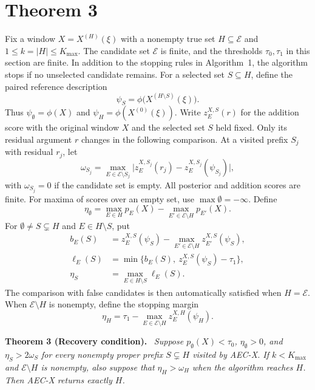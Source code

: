 \documentclass[10pt]{article}
\newcommand{\aecx}{\textup{\textsc{AEC-X}}\xspace}
\newcommand{\E}{\mathcal{E}}
\newenvironment{result}[1]{\par\medskip\noindent\textbf{#1.}\ \itshape\ignorespaces}{\par\medskip}
\theoremstyle{plain}
\theoremstyle{remark}
\begin{document}
\section{Theorem 3}
\label{sec:s-recovery}

Fix a window $X=X^{(H)}(\xi)$ with a nonempty true set $H\subseteq\E$ and $1\le k=|H|\le K_{\max}$. The candidate set $\E$ is finite, and the thresholds $\tau_0,\tau_1$ in this section are finite. In addition to the stopping rules in Algorithm~1, the algorithm stops if no unselected candidate remains. For a selected set $S\subseteq H$, define the paired reference description
\[
 \psi_S=\phi\bigl(X^{(H\setminus S)}(\xi)\bigr).
\]
Thus $\psi_\emptyset=\phi(X)$ and $\psi_H=\phi(X^{(0)}(\xi))$. Write $z_E^{X,S}(r)$ for the addition score with the original window $X$ and the selected set $S$ held fixed. Only its residual argument $r$ changes in the following comparison. At a visited prefix $S_j$ with residual $r_j$, let
\[
 \omega_{S_j}
 =\max_{E\in\E\setminus S_j}
  \bigl|z_E^{X,S_j}(r_j)-z_E^{X,S_j}(\psi_{S_j})\bigr|,
\]
with $\omega_{S_j}=0$ if the candidate set is empty. All posterior and addition scores are finite. For maxima of scores over an empty set, use $\max\emptyset=-\infty$. Define
\[
 \eta_\emptyset
 =\max_{E\in H}p_E(X)-\max_{E'\in\E\setminus H}p_{E'}(X).
\]
For $\emptyset\ne S\subsetneq H$ and $E\in H\setminus S$, put
\begin{align*}
 b_E(S)&=z_E^{X,S}(\psi_S)
          -\max_{E'\in\E\setminus H}z_{E'}^{X,S}(\psi_S),\\
 \ell_E(S)&=\min\{b_E(S),\ z_E^{X,S}(\psi_S)-\tau_1\},\\
 \eta_S&=\max_{E\in H\setminus S}\ell_E(S).
\end{align*}
The comparison with false candidates is then automatically satisfied when $H=\E$. When $\E\setminus H$ is nonempty, define the stopping margin
\[
 \eta_H=\tau_1-\max_{E\in\E\setminus H}z_E^{X,H}(\psi_H).
\]

\begin{result}{Theorem 3 (Recovery condition)}
Suppose $p_\emptyset(X)<\tau_0$, $\eta_\emptyset>0$, and $\eta_S>2\omega_S$ for every nonempty proper prefix $S\subsetneq H$ visited by \aecx. If $k<K_{\max}$ and $\E\setminus H$ is nonempty, also suppose that $\eta_H>\omega_H$ when the algorithm reaches $H$. Then \aecx returns exactly $H$.
\end{result}
\end{document}
